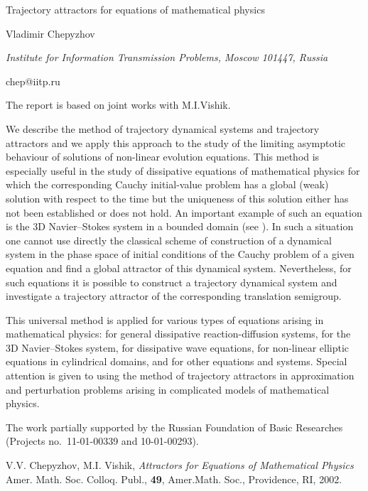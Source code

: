 \documentclass[10pt,a4paper]{article}
\begin{document}
\begin{center}

{\Large Trajectory attractors for equations of mathematical physics}

\bigskip

{\sc Vladimir Chepyzhov}

{\small\it Institute for Information Transmission Problems, Moscow 101447, Russia}

{\small\rm chep@iitp.ru}

\end{center}

\bigskip


The report is based on joint works with M.I.Vishik.

We describe the method of trajectory dynamical systems and
trajectory attractors and we apply this approach to the study of
the limiting asymptotic behaviour of solutions of non-linear
evolution equations. This method is especially useful in the study
of dissipative equations of mathematical physics for which the
corresponding Cauchy initial-value problem has a global (weak)
solution with respect to the time but the uniqueness of this
solution either has not been established or does not hold. An
important example of such an equation is the 3D Navier--Stokes
system in a bounded domain  (see \cite{CVbook}). In such a
situation one cannot use directly the classical scheme of
construction of a dynamical system in the phase space of initial
conditions of the Cauchy problem of a given equation and find a
global attractor of this dynamical system. Nevertheless, for such
equations it is possible to construct a trajectory dynamical system
and investigate a trajectory attractor of the corresponding
translation semigroup.

This universal method is applied for various types of equations
arising in mathematical physics: for general dissipative
reaction-diffusion systems, for the 3D Navier--Stokes system, for
dissipative wave equations, for non-linear elliptic equations in
cylindrical domains, and for other equations and systems. Special
attention is given to using the method of trajectory attractors in
approximation and perturbation problems arising in complicated
models of mathematical physics.

The work partially supported by the Russian Foundation of Basic
Researches (Projects no.\ 11-01-00339 and 10-01-00293).


\begin{thebibliography}{99}


V.V. Chepyzhov, M.I. Vishik, \emph{Attractors for
Equations of Mathematical Physics} Amer. Math. Soc. Colloq.
Publ., \textbf{49}, Amer.Math. Soc., Providence, RI, 2002.

\end{thebibliography}
\end{document}
